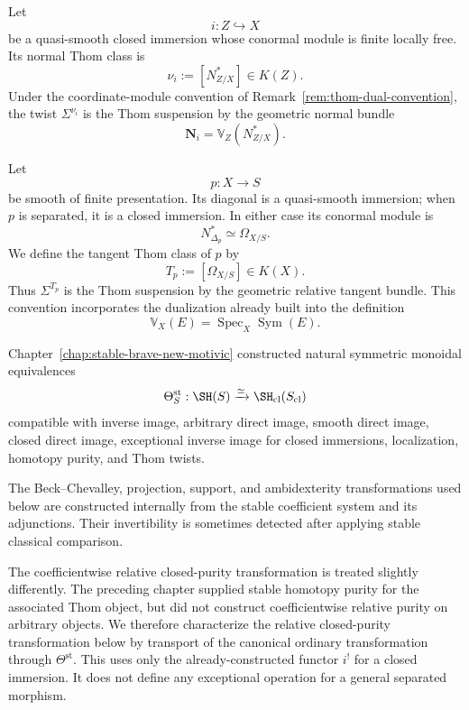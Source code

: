 \begin{convention}
\label{conv:tangent-normal-classes}
Let
\[
    i:Z\hookrightarrow X
\]
be a quasi-smooth closed immersion whose conormal module is finite locally
free.  Its normal Thom class is
\[
    \nu_i
    :=
    [N^*_{Z/X}]
    \in
    K(Z).
\]
Under the coordinate-module convention of
Remark~\ref{rem:thom-dual-convention}, the twist \(\Sigma^{\nu_i}\) is the
Thom suspension by the geometric normal bundle
\[
    \mathbf N_i
    =
    \mathbb V_Z(N^*_{Z/X}).
\]

Let
\[
    p:X\longrightarrow S
\]
be smooth of finite presentation.  Its diagonal is a quasi-smooth
immersion; when \(p\) is separated, it is a closed immersion.  In either
case its conormal module is
\[
    N^*_{\Delta_p}
    \simeq
    \Omega_{X/S}.
\]
We define the tangent Thom class of \(p\) by
\[
    T_p
    :=
    [\Omega_{X/S}]
    \in
    K(X).
\]
Thus \(\Sigma^{T_p}\) is the Thom suspension by the geometric relative
tangent bundle.  This convention incorporates the dualization already built
into the definition
\[
    \mathbb V_X(E)
    =
    \operatorname{Spec}_X\operatorname{Sym}(E).
\]
\end{convention}

\begin{remark}
\label{rem:proper-comparison-method}
Chapter~\ref{chap:stable-brave-new-motivic} constructed natural symmetric
monoidal equivalences
\[
    \Theta_S^{\mathrm{st}}:
    \SH(S)
    \xrightarrow{\simeq}
    \SH_{\mathrm{cl}}(S_{\mathrm{cl}})
\]
compatible with inverse image, arbitrary direct image, smooth direct image,
closed direct image, exceptional inverse image for closed immersions,
localization, homotopy purity, and Thom twists.

The Beck--Chevalley, projection, support, and ambidexterity transformations
used below are constructed internally from the stable coefficient system and
its adjunctions.  Their invertibility is sometimes detected after applying
stable classical comparison.

The coefficientwise relative closed-purity transformation is treated
slightly differently.  The preceding chapter supplied stable homotopy purity
for the associated Thom object, but did not construct coefficientwise
relative purity on arbitrary objects.  We therefore characterize the
relative closed-purity transformation below by transport of the canonical
ordinary transformation through
\(\Theta^{\mathrm{st}}\).  This uses only the already-constructed functor
\(i^!\) for a closed immersion.  It does not define any exceptional operation
for a general separated morphism.
\end{remark}

